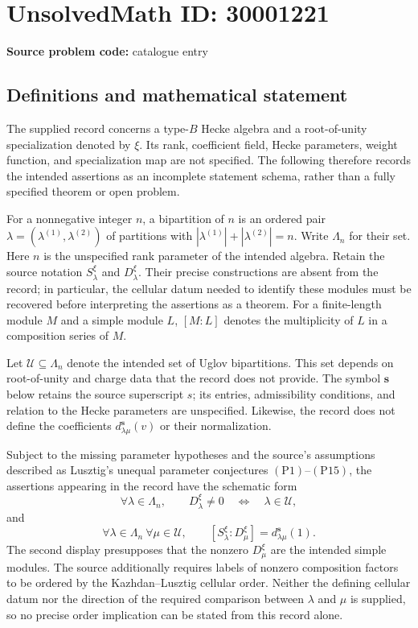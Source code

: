 \documentclass[11pt]{article}
\begin{document}
\section*{UnsolvedMath ID: 30001221}
\textbf{Source problem code:} catalogue entry
\subsection{Definitions and mathematical statement}
The supplied record concerns a type\(\text{-}B\) Hecke algebra and a root-of-unity specialization denoted by \(\xi\). Its rank, coefficient field, Hecke parameters, weight function, and specialization map are not specified. The following therefore records the intended assertions as an incomplete statement schema, rather than a fully specified theorem or open problem.

For a nonnegative integer \(n\), a bipartition of \(n\) is an ordered pair \(\lambda=(\lambda^{(1)},\lambda^{(2)})\) of partitions with \(|\lambda^{(1)}|+|\lambda^{(2)}|=n\). Write \(\Lambda_n\) for their set. Here \(n\) is the unspecified rank parameter of the intended algebra. Retain the source notation \(S^\xi_\lambda\) and \(D^\xi_\lambda\). Their precise constructions are absent from the record; in particular, the cellular datum needed to identify these modules must be recovered before interpreting the assertions as a theorem. For a finite-length module \(M\) and a simple module \(L\), \([M:L]\) denotes the multiplicity of \(L\) in a composition series of \(M\).

Let \(\mathcal U\subseteq\Lambda_n\) denote the intended set of Uglov bipartitions. This set depends on root-of-unity and charge data that the record does not provide. The symbol \(\mathbf s\) below retains the source superscript \(s\); its entries, admissibility conditions, and relation to the Hecke parameters are unspecified. Likewise, the record does not define the coefficients \(d^{\mathbf s}_{\lambda\mu}(v)\) or their normalization.

Subject to the missing parameter hypotheses and the source's assumptions described as Lusztig's unequal parameter conjectures \((\mathrm P1)\)--\((\mathrm P15)\), the assertions appearing in the record have the schematic form
\[
\forall\lambda\in\Lambda_n,\qquad
D^\xi_\lambda\ne0
\quad\Longleftrightarrow\quad
\lambda\in\mathcal U,
\]
and
\[
\forall\lambda\in\Lambda_n\ \forall\mu\in\mathcal U,\qquad
[S^\xi_\lambda:D^\xi_\mu]
=d^{\mathbf s}_{\lambda\mu}(1).
\]
The second display presupposes that the nonzero \(D^\xi_\mu\) are the intended simple modules. The source additionally requires labels of nonzero composition factors to be ordered by the Kazhdan--Lusztig cellular order. Neither the defining cellular datum nor the direction of the required comparison between \(\lambda\) and \(\mu\) is supplied, so no precise order implication can be stated from this record alone.
\end{document}
